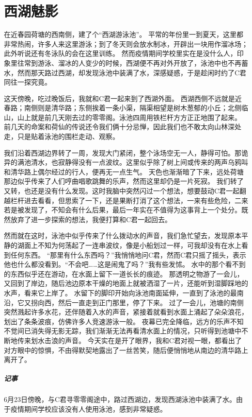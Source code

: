 \chapter{西湖魅影}

在近春园荷塘的西南侧，建了个“西湖游泳池”。
平常的年份里一到夏天，这里都非常热闹，许多人来这里游泳；到了冬天则会放水制冰，开辟出一块用作溜冰场；此外听说还有冬泳队的会在这里训练。
然而疫情期间学校里实在是没什么人，印象里往常到游泳、溜冰的人变少的时候，西湖便不再对外开放了，泳池中也不再蓄水，然而那天路过西湖，却发现泳池中装满了水，深感疑惑，于是趁闲时约了C君同往一探究竟。

这天傍晚，吃过晚饭后，我就和C君一起来到了西湖外面。
西湖西侧不远就是近春路；南侧则是清华路；东侧挨着一条小渠，隔渠相望是树木葱郁的小丘；北侧临山，山上就是前几天刚去过的零零阁。泳池四周用铁栏杆方方正正地围了起来。
前几天的命案和荷仙的传说还令我们俩十分忌惮，因此我们也不敢太向山林深处走，只是贴着泳池的围栏走动、观察。

我们沿着西湖边界转了一周，发现大门紧闭，整个泳场空无一人，静得可怕。那诡异的满池清水，也寂静得没有一点波纹。这里似乎除了树上间或传来的两声乌鸦叫和清华路上偶尔经过的行人，便再无一点生气。
天色也渐渐暗了下来，远处荷塘那边似乎传来了人们哼曲唱歌跳舞的乐声，然而这里却仍是一片死寂。
我们转了又转，也还是没有什么发现。这时我脑中突然闪过一个想法，想要鼓动C君一起翻越栏杆进去看看，但思索了一下，还是果断打消了这个想法，一来有些危险，二来若是被发现了，不知会有什么后果，最后一年实在不值得为这事背上一个处分。既然放弃了进一步探索的想法，我便打算和C君一起回去。

然而就在这时，泳池中似乎传来了什么拨动水的声音，我们急忙望去，发现原本平静的湖面上不知为何荡起了一连串波纹，像是小船划过一样，可我却没有在水上看到任何东西。
“那里有什么东西吗？”我悄悄地问C君，然而C君只摇了摇头，表示他也什么都没看到。“不会吧……这是闹鬼了吗？”我有些发怵。
水中的那个看不到的东西似乎还在游动，在水面上留下一道长长的痕迹。
那透明之物游了一会儿，又回到了岸边，随后池边原本干燥的地面上就被洒湿了一片，还能听到湿脚踩地的水声，看来它上岸了。
水留下的脚印开始向泳池南面延伸，一直到了泳池的最南沿，它又拐向西，然后一直走到正门那里，停了下来。
过了一会儿，池塘的南侧突然溅起许多水花，还伴随着入水的声音，紧接着就看到水面上涌起了朵朵浪花，划出了条条波痕，仿佛许多人竞速游泳一般。
夜幕已完全降临，远方的乐声不知不觉间已消失得无影无踪，我们渐渐无法再看清水面上的情况，只听得到池塘中不断地传来划水击浪的声音。
今天实在是开了眼界，我和C君对视一眼，都看出了对方眼中的惊惧，不由得默契地露出了一丝苦笑，随后便悄悄地从南边的清华路上离开了。

\vfill

\paragraph{记事}
6月23日傍晚，与C君寻零零阁途中，路过西湖边，发现西湖泳池中装满了水。由于疫情期间学校应该没有人使用泳池，感到非常疑惑。
